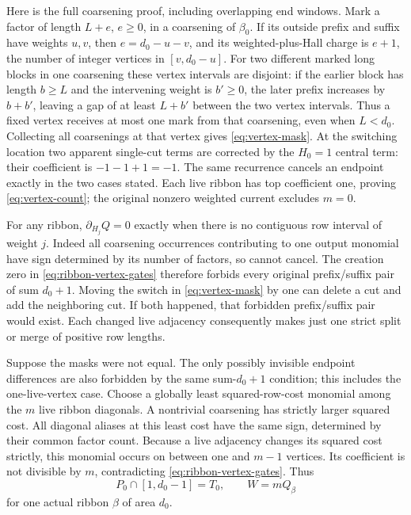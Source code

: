 \documentclass[11pt,a4paper]{amsart}
\numberwithin{equation}{section}
\theoremstyle{plain}
\theoremstyle{definition}
\begin{document}
Here is the full coarsening proof, including overlapping end windows.
Mark a factor of length \(L+e\), \(e\ge0\), in a coarsening of \(\beta_0\).
If its outside prefix and suffix have weights \(u,v\), then
\(e=d_0-u-v\), and its weighted-plus-Hall charge is \(e+1\), the number of
integer vertices in \([v,d_0-u]\).  For two different marked long blocks in
one coarsening these vertex intervals are disjoint: if the earlier block
has length \(b\ge L\) and the intervening weight is \(b'\ge0\), the later
prefix increases by \(b+b'\), leaving a gap of at least \(L+b'\) between the
two vertex intervals.  Thus a fixed vertex receives at most one mark from
that coarsening, even when \(L<d_0\).
Collecting all coarsenings at that vertex gives \eqref{eq:vertex-mask}.
At the switching location two apparent single-cut terms are corrected by
the \(H_0=1\) central term: their coefficient is \(-1-1+1=-1\).
The same recurrence cancels an endpoint exactly in the two cases stated.
Each live ribbon has top coefficient one, proving \eqref{eq:vertex-count};
the original nonzero weighted current excludes \(m=0\).

For any ribbon, \(\partial_{H_j}Q=0\) exactly when there is no contiguous
row interval of weight \(j\).  Indeed all coarsening occurrences contributing
to one output monomial have sign determined by its number of factors,
so cannot cancel.  The creation zero in \eqref{eq:ribbon-vertex-gates}
therefore forbids every original prefix/suffix pair of sum \(d_0+1\).
Moving the switch in \eqref{eq:vertex-mask} by one can delete a cut and add
the neighboring cut.  If both happened, that forbidden prefix/suffix pair
would exist.  Each changed live adjacency consequently makes just one
strict split or merge of positive row lengths.

Suppose the masks were not equal.  The only possibly invisible endpoint
differences are also forbidden by the same sum-\(d_0+1\) condition; this
includes the one-live-vertex case.  Choose a globally least squared-row-cost
monomial among the \(m\) live ribbon diagonals.  A nontrivial coarsening has
strictly larger squared cost.  All diagonal aliases at this least cost
have the same sign, determined by their common factor count.  Because a
live adjacency changes its squared cost strictly, this monomial occurs
on between one and \(m-1\) vertices.  Its coefficient is not divisible by
\(m\), contradicting \eqref{eq:ribbon-vertex-gates}.  Thus
\begin{equation}\label{eq:vertex-saturation}
 P_0\cap[1,d_0-1]=T_0,\qquad W=mQ_\beta
\end{equation}
for one actual ribbon \(\beta\) of area \(d_0\).
\end{document}

